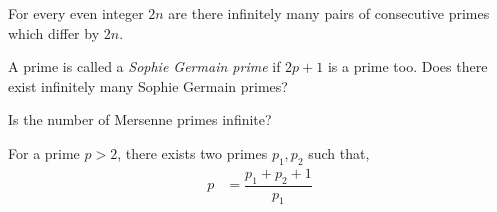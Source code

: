 \documentclass{subfiles}
\begin{document}
	\begin{conjecture}
		For every even integer $2n$ are there infinitely many pairs of consecutive primes which differ by $2n$.
	\end{conjecture}

	\begin{conjecture}
		A prime is called a \textit{Sophie Germain prime} if $2p+1$ is a prime too. Does there exist infinitely many Sophie Germain primes?
	\end{conjecture}

	\begin{conjecture}
		Is the number of Mersenne primes infinite?
	\end{conjecture}


	\begin{conjecture}
		For a prime $p>2$, there exists two primes $p_1,p_2$ such that,
			\begin{align*}
				p & = \dfrac{p_1+p_2+1}{p_1}
			\end{align*}
	\end{conjecture}
\end{document}
